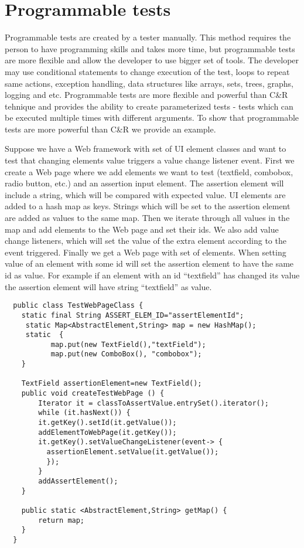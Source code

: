 		\section{Programmable tests} 
		\label{sec:programTests}
			Programmable tests are created by a tester manually. This method requires the
			person to have programming skills and takes more time, but programmable tests
			are more flexible and allow the developer to use bigger set of tools. The
			developer may use conditional statements to change execution of the test,
			loops to repeat same actions, exception handling, data structures like
			arrays, sets, trees, graphs, logging and etc. Programmable tests are more
			flexible and powerful than C\&R tehnique and provides the ability to create parameterized
			tests - tests which can be executed multiple times with different arguments.
			To show that programmable tests are more powerful than C\&R we provide an
			example.
			
			
			Suppose we have a Web framework with set of UI element classes and want to
			test that changing elements value triggers a value change listener event.
			First we create a Web page where we add elements we
			want to test (textfield, combobox, radio button, etc.) and an assertion input
			element. The assertion element will include a string, which will be
			compared with expected value.
			UI elements are added to a hash map as keys.
			Strings which will be set to the assertion element are added as values to the same map. Then we
			iterate through all values in the map and add elements to the Web page and
			set their ids. We also add value change listeners, which will set
			the value of the extra element according to the event triggered. Finally we
			get a Web page with set of elements. When setting value of an element with
			some id will set the assertion element to have the same id as value. For
			example if an element with an id ``textfield'' has changed its value the
			assertion element will have string ``textfield'' as value.
					
  \begin{lstlisting}
  public class TestWebPageClass {
  	static final String ASSERT_ELEM_ID="assertElementId";
  	 static Map<AbstractElement,String> map = new HashMap();
  	 static  {
    	   map.put(new TextField(),"textField");
    	   map.put(new ComboBox(), "combobox");
  	}
  
  	TextField assertionElement=new TextField();
  	public void createTestWebPage () {
  	    Iterator it = classToAssertValue.entrySet().iterator();
  	    while (it.hasNext()) {
  	    it.getKey().setId(it.getValue());
  	    addElementToWebPage(it.getKey());
  	    it.getKey().setValueChangeListener(event-> {
  	      assertionElement.setValue(it.getValue());
  	      });
  	  	}
  		addAssertElement();
  	}  
  	
  	public static <AbstractElement,String> getMap() {
  		return map;
  	}
  }
  \end{lstlisting}
      
